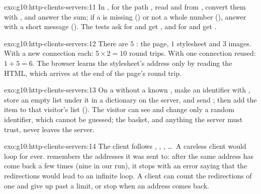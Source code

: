 \begin{solution}{exo:g10:http-clients-servers:11}
In , for the path , read  and  from , convert them
with , and answer the sum; if a  is missing () or not a whole number
(), answer  with a short message (). The tests ask for
 and get , and for  and get .
\end{solution}

\begin{solution}{exo:g10:http-clients-servers:12}
There are $5$ : the page, $1$ stylesheet and $3$ images. With a new connection each: $5 \times 2 = 10$ round
trips. With one connection reused: $1 + 5 = 6$. The browser learns the stylesheet's address only by reading the HTML,
which arrives at the end of the page's round trip.
\end{solution}

\begin{solution}{exo:g10:http-clients-servers:13}
On a  without a known  , make an identifier with , store an empty
list under it in a dictionary on the server, and send ; then add the item to that
visitor's list (). The visitor can see and change only a random identifier, which
cannot be guessed; the basket, and anything the server must trust, never leaves the server.
\end{solution}

\begin{solution}{exo:g10:http-clients-servers:14}
The client follows , , , \dots\ A careless client would loop for ever. 
remembers the addresses it was sent to: after the same address has come back a few times (nine  in our
run), it stops with an error saying that the redirections would lead to an infinite loop. A client can count the
redirections of one  and give up past a limit, or stop when an address comes back.
\end{solution}

